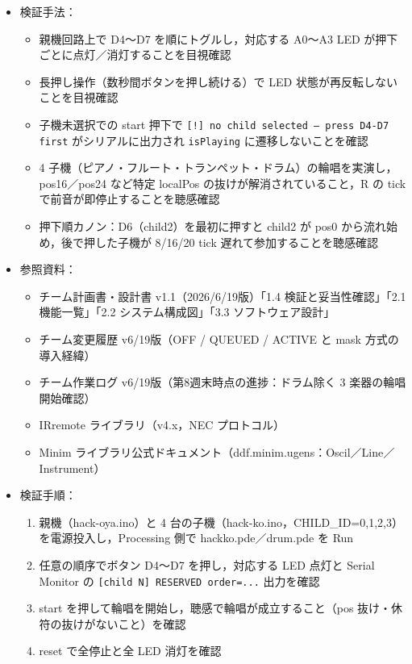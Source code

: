 \documentclass[a4paper,11pt]{ltjsarticle}
\providecommand{\％}{\%}
\begin{document}
\begin{itemize}
    \item 検証手法：
    \begin{itemize}
        \item 親機回路上で D4〜D7 を順にトグルし，対応する A0〜A3 LED が押下ごとに点灯／消灯することを目視確認
        \item 長押し操作（数秒間ボタンを押し続ける）で LED 状態が再反転しないことを目視確認
        \item 子機未選択での start 押下で \texttt{[!] no child selected -- press D4-D7 first} がシリアルに出力され \texttt{isPlaying} に遷移しないことを確認
        \item 4 子機（ピアノ・フルート・トランペット・ドラム）の輪唱を実演し，pos16／pos24 など特定 localPos の抜けが解消されていること，R の tick で前音が即停止することを聴感確認
        \item 押下順カノン：D6（child2）を最初に押すと child2 が pos0 から流れ始め，後で押した子機が 8/16/20 tick 遅れて参加することを聴感確認
    \end{itemize}
    \item 参照資料：
    \begin{itemize}
        \item チーム計画書・設計書 v1.1（2026/6/19版）「1.4 検証と妥当性確認」「2.1 機能一覧」「2.2 システム構成図」「3.3 ソフトウェア設計」
        \item チーム変更履歴 v6/19版（OFF / QUEUED / ACTIVE と mask 方式の導入経緯）
        \item チーム作業ログ v6/19版（第8週末時点の進捗：ドラム除く 3 楽器の輪唱開始確認）
        \item IRremote ライブラリ（v4.x，NEC プロトコル）
        \item Minim ライブラリ公式ドキュメント（ddf.minim.ugens：Oscil／Line／Instrument）
    \end{itemize}
    \item 検証手順：
    \begin{enumerate}
        \item 親機（hack-oya.ino）と 4 台の子機（hack-ko.ino，CHILD\_ID=0,1,2,3）を電源投入し，Processing 側で hackko.pde／drum.pde を Run
        \item 任意の順序でボタン D4〜D7 を押し，対応する LED 点灯と Serial Monitor の \texttt{[child N] RESERVED order=...} 出力を確認
        \item start を押して輪唱を開始し，聴感で輪唱が成立すること（pos 抜け・休符の抜けがないこと）を確認
        \item reset で全停止と全 LED 消灯を確認
    \end{enumerate}
\end{itemize}
\end{document}
